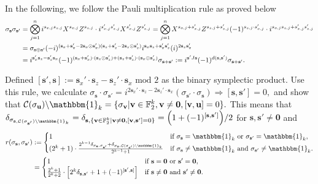 \documentclass[aps,%
twocolumn,%
floatfix,%
pra,%
amsfonts,%
groupedaddress,%
superscriptaddress]{revtex4-2}%
\newcommand{\1}{\mathbbm{1}}
\begin{document}
In the following, we follow the Pauli multiplication rule as proved below 
     \begin{align}
         \sigma_{\mathbf{s}}\sigma_{\mathbf{s}'} &= \bigotimes_{j = 1}^n i^{s_{x,j} s_{z,j}} X^{s_{x,j}}Z^{s_{z,j}} \cdot i^{s'_{x,j} s'_{z,j}} X^{s'_{x,j}}Z^{s'_{z,j}} =  \bigotimes_{j = 1}^n X^{s_{x,j}+s_{x,j}'}Z^{s_{z,j}+s_{z,j}'} (-1)^{s_{z,j}\cdot s_{x,j}'} \cdot i^{s_{x,j}s_{z,j}+s_{x,j}'s_{z,j}'} \notag \\
         &= \sigma_{\mathbf{s}\oplus \mathbf{s}'} (-i)^{(\mathbf{s}_x+ \mathbf{s}_x'-2\mathbf{s}_x\odot\mathbf{s}_x')(\mathbf{s}_z+\mathbf{s}_z' - 2\mathbf{s}_z\odot\mathbf{s}_z')} i^{\mathbf{s}_x\mathbf{s}_z + \mathbf{s}_x'\mathbf{s}_z'}(i)^{2\mathbf{s}_z\mathbf{s}_x'} \\
         &=i^{\mathbf{s}_x'\mathbf{s}_z - \mathbf{s}_z'\mathbf{s}_x} (-1)^{(\mathbf{s}_x + \mathbf{s}_x') \cdot (\mathbf{s}_z \odot \mathbf{s}_z') + (\mathbf{s}_z + \mathbf{s}_z') \cdot (\mathbf{s}_x \odot \mathbf{s}_x')}\sigma_{\mathbf{s}+ \mathbf{s}'} := i^{\mathbf{s}' J \mathbf{s}} (-1)^{d(\mathbf{s},\mathbf{s}')}\sigma_{\mathbf{s}+ \mathbf{s}'} .
     \end{align}

Defined $[\mathbf{s}', \mathbf{s}]:= \mathbf{s}_x'\cdot \mathbf{s}_z - \mathbf{s}_z'\cdot \mathbf{s}_x \text{~mod~} 2$ as the binary symplectic product. Use this rule, we calculate  $ \sigma_{\mathbf{s}}\cdot \sigma_{\mathbf{s}'}=i^{2\mathbf{s}_x'\cdot \mathbf{s}_z - 2\mathbf{s}_z'\cdot \mathbf{s}_x }  (\sigma_{\mathbf{s}'} \cdot \sigma_{\mathbf{s}}) \Rightarrow [\mathbf{s}, \mathbf{s}'] = 0,$ and show that $\mathcal{C}(\sigma_{\mathbf{u}} )\backslash \1_k= \{\sigma_{\mathbf{v}}|\mathbf{v}\in \mathbb{F}_2^k,\mathbf{v}\neq \mathbf{0},[\mathbf{v},\mathbf{u}] = 0\}.$
This means that $\delta_{\sigma_{\mathbf{s},\mathcal{C}(\sigma_{\mathbf{s}'} )\backslash \1_k}} = \delta_{\mathbf{s}, \{\mathbf{v}\in \mathbb{F}_2^k|\mathbf{v}\neq \mathbf{0},[\mathbf{v},\mathbf{s}'] = 0\}} = {\left(1 + (-1)^{[\mathbf{s},\mathbf{s}']}\right)}/{2}$ for $\mathbf{s},\mathbf{s}' \neq \mathbf{0}$ and 
\begin{align}\label{eq:lc_Pauli_rescale}
r(\sigma_{\mathbf{s}},\sigma_{\mathbf{s}'})& := \begin{cases}
            1 &\text{if~}\sigma_{\mathbf{s}} = \1_k \text{~or~}\sigma_{\mathbf{s}'} = \1_k ,\\
            (2^k+1) \cdot \frac{2^{k-1}\delta_{\sigma_{\mathbf{s}},\sigma_{\mathbf{s}'}} +\delta_{\sigma_{\mathbf{s}}, \mathcal{C}(\sigma_{\mathbf{s}'})\backslash \1_k } }{2^{k-1}+1} &\text{if~}\sigma_{\mathbf{s}} \neq \1_k \text{~and~} \sigma_{\mathbf{s}'}\neq \1_k .
        \end{cases}\\
&= \begin{cases}
            1 &\text{if~}\mathbf{s} = \mathbf{0}\text{~or~}\mathbf{s}' = \mathbf{0} ,\\
            \frac{2^k+1}{2^{k}+2} \cdot \left[2^{k}\delta_{\mathbf{s},\mathbf{s}'} +1+ (-1)^{[\mathbf{s}',\mathbf{s}]}\right]  &\text{if~}\mathbf{s} \neq \mathbf{0}\text{~and~}\mathbf{s}' \neq \mathbf{0} .
        \end{cases}
\end{align}
\end{document}
